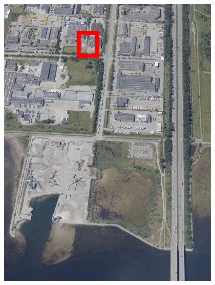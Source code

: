 \documentclass[10pt,letterpaper]{article}
\begin{document}
\begin{figure}
    \centering
    \capstart
    \begin{minipage}[b]{0.32\linewidth}
        \includegraphics[width=\textwidth]{images/copenhagen/figures/2019_84_40_5_0034_00002391.jpg}
    \end{minipage}
    \begin{minipage}[b]{0.32\linewidth}

\end{minipage}
\end{figure}
\end{document}
